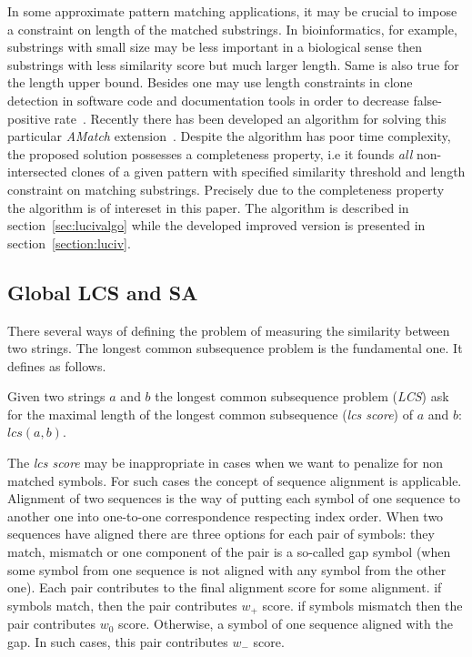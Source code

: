 In some approximate pattern matching applications, it may be crucial to impose a constraint on length of the matched substrings.
In bioinformatics, for example, substrings with small size may be less important in a biological sense then substrings with less similarity score but much larger length.
Same is also true for the length upper bound.
Besides one may use length constraints in clone detection in software code and documentation tools in order to decrease false-positive rate~\cite{luciv2019interactive}.
Recently there has been developed an algorithm for solving this particular \emph{AMatch} extension~\cite{luciv2019interactive}.
Despite the algorithm has poor time complexity, the proposed solution possesses a completeness property, i.e it founds \emph{all} non-intersected clones of a given pattern with specified similarity threshold and length constraint on matching substrings.
Precisely due to the completeness property the algorithm is of intereset in this paper.
The algorithm is described in section~\ref{sec:lucivalgo} while the developed improved version is presented in section~\ref{section:luciv}.

\subsection{Global LCS and SA}
There several ways of defining the problem of measuring the similarity between two strings.
The longest common subsequence problem is the fundamental one.
It defines as follows.

\begin{definition}
Given two strings $a$ and $b$ the longest common subsequence problem (\emph{LCS}) ask for the maximal length of the longest common subsequence (\emph{lcs score}) of $a$ and $b$: $lcs(a,b)$.
\end{definition} 

The \emph{lcs score} may be inappropriate in cases when we want to penalize for non matched symbols.
For such cases the concept of sequence alignment is applicable.
Alignment of two sequences is the way of putting each symbol of one sequence to another one into one-to-one correspondence respecting index order.
When two sequences have aligned there are three options for each pair of symbols: they match, mismatch or one component of the pair is a so-called gap symbol (when some symbol from one sequence is not aligned with any symbol from the other one).
Each pair contributes to the final alignment score for some alignment.
if symbols match, then the pair contributes $w_{+}$ score. 
if symbols mismatch then the pair contributes $w_{0}$ score.
Otherwise, a symbol of one sequence aligned with the gap.
In such cases, this pair contributes $w_{-}$ score.

